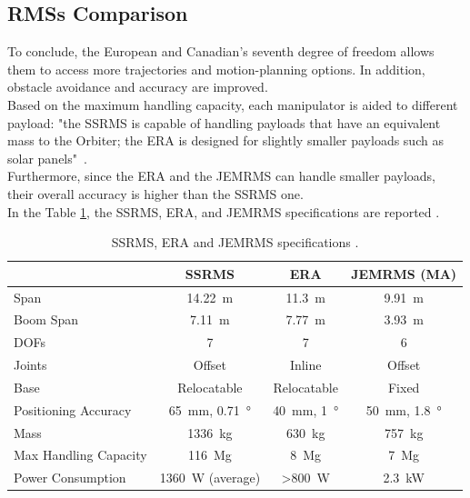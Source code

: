 \documentclass[a4paper,12pt,oneside]{report}
\begin{document}
\subsection{RMSs Comparison}
To conclude, the European and Canadian's seventh degree of freedom allows them to access more trajectories and motion-planning options. In addition, obstacle avoidance and accuracy are improved.\\
Based on the maximum handling capacity, each manipulator is aided to different payload: "the SSRMS is capable of handling payloads that have an equivalent mass to the Orbiter; the ERA is designed for slightly smaller payloads such as solar panels"~\cite{four}.\\
Furthermore, since the ERA and the JEMRMS can handle smaller payloads, their overall accuracy is higher than the SSRMS one.\\
In the Table \ref{SRMs_comparison}, the SSRMS, ERA, and JEMRMS specifications are reported \cite{four}.
  \begin{table}[h]
    \caption{SSRMS, ERA and JEMRMS specifications \cite{four}.}
    \label{SRMs_comparison}
    \begin{center}
    \begin{tabular}{lccc}
      \toprule
    & \textbf{SSRMS} & \textbf{ERA} & \textbf{JEMRMS (MA)}\\
    \midrule
    Span&\SI{14.22}{\metre}&\SI{11.3}{\metre}&\SI{9.91}{\metre}\\
    Boom Span&\SI{7.11}{\metre}&\SI{7.77}{\metre}&\SI{3.93}{\metre}\\
    DOFs&7&7&6\\
    Joints&Offset&Inline&Offset\\
    Base&Relocatable&Relocatable&Fixed\\
    Positioning Accuracy&\SI{65}{\milli\metre}, \SI{0.71}{\degree}&\SI{40}{\milli\metre}, \SI{1}{\degree}&\SI{50}{\milli\metre}, \SI{1.8}{\degree}\\
    Mass&\SI{1336}{\kilogram}&\SI{630}{\kilogram}&\SI{757}{\kilogram}\\
    Max Handling Capacity&\SI{116}{\mega\gram}&\SI{8}{\mega\gram}&\SI{7}{\mega\gram}\\
    Power Consumption&\SI{1360}{\watt} (average)&>\SI{800}{\watt}&\SI{2.3}{\kilo\watt}\\
    \bottomrule
    \end{tabular}
    \end{center}
    \end{table}
\end{document}
